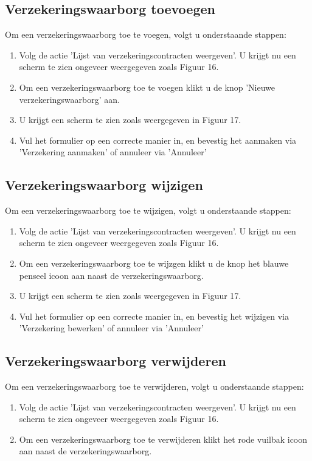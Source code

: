 \documentclass[11pt,openany]{article}
\begin{document}
\subsection{Verzekeringswaarborg toevoegen}
Om een verzekeringswaarborg toe te voegen, volgt u onderstaande stappen:
\begin{enumerate}
	\item Volg de actie 'Lijst van verzekeringscontracten weergeven'. U krijgt nu een scherm te zien ongeveer weergegeven zoals Figuur 16.
	\item Om een verzekeringswaarborg toe te voegen klikt u de knop 'Nieuwe verzekeringswaarborg' aan.
	\item U krijgt een scherm te zien zoals weergegeven in Figuur 17.
	\item Vul het formulier op een correcte manier in, en bevestig het aanmaken via 'Verzekering aanmaken' of annuleer via 'Annuleer'
\end{enumerate}
\subsection{Verzekeringswaarborg wijzigen}
Om een verzekeringswaarborg toe te wijzigen, volgt u onderstaande stappen:
\begin{enumerate}
	\item Volg de actie 'Lijst van verzekeringscontracten weergeven'. U krijgt nu een scherm te zien ongeveer weergegeven zoals Figuur 16.
	\item Om een verzekeringswaarborg toe te wijzgen klikt u de knop het blauwe penseel icoon aan naast de verzekeringswaarborg.
	\item U krijgt een scherm te zien zoals weergegeven in Figuur 17.
	\item Vul het formulier op een correcte manier in, en bevestig het wijzigen via 'Verzekering bewerken' of annuleer via 'Annuleer'
\end{enumerate}

\subsection{Verzekeringswaarborg verwijderen}
Om een verzekeringswaarborg toe te verwijderen, volgt u onderstaande stappen:
\begin{enumerate}
	\item Volg de actie 'Lijst van verzekeringscontracten weergeven'. U krijgt nu een scherm te zien ongeveer weergegeven zoals Figuur 16.
	\item Om een verzekeringswaarborg toe te verwijderen klikt het rode vuilbak icoon aan naast de verzekeringswaarborg.
\end{enumerate}
\end{document}
